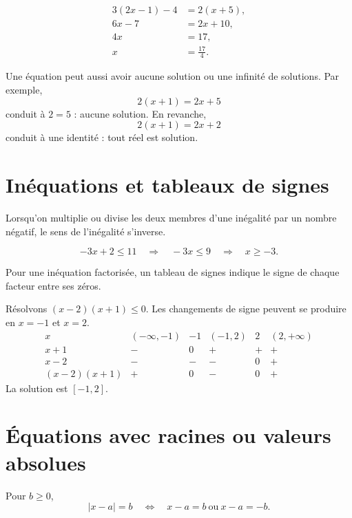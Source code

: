 \documentclass[12pt,a4paper,openany]{book}
\newcommand{\abs}[1]{\left\lvert #1\right\rvert}
\begin{document}
\begin{examplebox}
\begin{align*}
3(2x-1)-4&=2(x+5),\\
6x-7&=2x+10,\\
4x&=17,\\
x&=\frac{17}{4}.
\end{align*}
\end{examplebox}

Une équation peut aussi avoir aucune solution ou une infinité de solutions. Par exemple,
\[
2(x+1)=2x+5
\]
conduit à $2=5$ : aucune solution. En revanche,
\[
2(x+1)=2x+2
\]
conduit à une identité : tout réel est solution.

\section{Inéquations et tableaux de signes}

\begin{warningbox}
Lorsqu'on multiplie ou divise les deux membres d'une inégalité par un nombre négatif, le sens de l'inégalité s'inverse.
\end{warningbox}

\begin{examplebox}
\[
-3x+2\le11
\quad\Longrightarrow\quad
-3x\le9
\quad\Longrightarrow\quad
x\ge-3.
\]
\end{examplebox}

Pour une inéquation factorisée, un tableau de signes indique le signe de chaque facteur entre ses zéros.

\begin{examplebox}
Résolvons $(x-2)(x+1)\le0$. Les changements de signe peuvent se produire en $x=-1$ et $x=2$.
\[
\begin{array}{c|ccccc}
x&(-\infty,-1)&-1&(-1,2)&2&(2,+\infty)\\ \hline
x+1&-&0&+&+&+\\
x-2&-&-&-&0&+\\ \hline
(x-2)(x+1)&+&0&-&0&+
\end{array}
\]
La solution est $[-1,2]$.
\end{examplebox}

\section{Équations avec racines ou valeurs absolues}

Pour $b\ge0$,
\[
\abs{x-a}=b\quad\Longleftrightarrow\quad x-a=b\ \text{ou}\ x-a=-b.
\]
\end{document}

